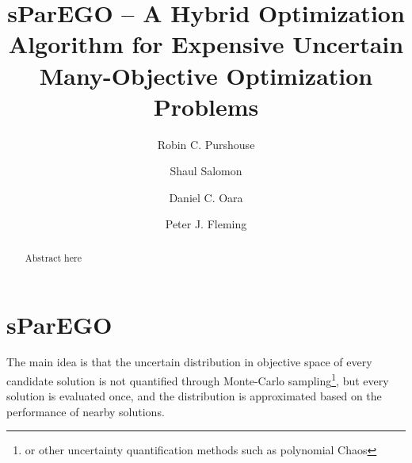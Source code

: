 \documentclass[10pt]{llncs}
\begin{document}
\title{sParEGO -- A Hybrid Optimization Algorithm for Expensive Uncertain Many-Objective Optimization Problems}
\author{Robin C. Purshouse \and Shaul Salomon \and Daniel C. Oara \and Peter J. Fleming}

\maketitle

\begin{abstract}
Abstract here
\end{abstract}

\section{sParEGO}
The main idea is that the uncertain distribution in objective space of every candidate solution is not quantified through Monte-Carlo sampling\footnote{or other uncertainty quantification methods such as polynomial Chaos}, but every solution is evaluated once, and the distribution is approximated based on the performance of nearby solutions.
\end{document}
